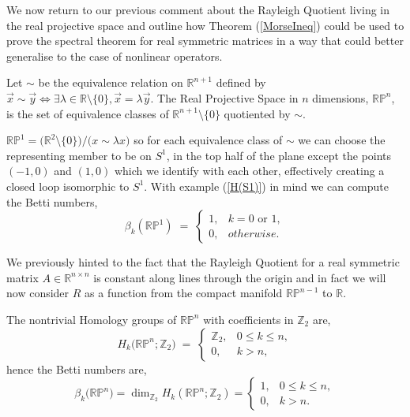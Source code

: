 \noindent We now return to our previous comment about the Rayleigh Quotient living in the real projective space and outline how Theorem (\ref{MorseIneq}) could be used to prove the spectral theorem for real symmetric matrices in a way that could better generalise to the case of nonlinear operators.

\begin{definition}
Let $\sim$ be the equivalence relation on $\mathbb{R}^{n+1}$ defined by $\vec{x} \sim \vec{y} \Leftrightarrow \exists \lambda \in \mathbb{R} \setminus \{0\}, \vec{x} = \lambda \vec{y}$.
The Real Projective Space in $n$ dimensions, $\mathbb{RP}^n$, is the set of equivalence classes of $\mathbb{R}^{n+1} \setminus \{0\}$ quotiented by $\sim$.
\end{definition}

\begin{example}
$\mathbb{RP}^1 = \bigl(\mathbb{R}^2\setminus\{0\}\bigr)\big/\!\bigl(x\sim \lambda x\bigr)$ so for each equivalence class of $\sim$ we can choose the representing member to be on $S^1$, in the top half of the plane except the points $(-1,0)$ and $(1,0)$ which we identify with each other, effectively creating a closed loop isomorphic to $S^1$. With example (\ref{H(S1)}) in mind we can compute the Betti numbers, 
\[
   \beta_k(\mathbb{RP}^1)
   \;=\;
   \begin{cases}
     1, &  k=0\text{ or }1,\\[2pt]
     0, & otherwise.
   \end{cases}
\]
\end{example}
\begin{remark}
We previously hinted to the fact that the Rayleigh Quotient for a real symmetric matrix $A\in \mathbb{R}^{n\times n}$ is constant along lines through the origin and in fact we will now consider $R$ as a function from the compact manifold $\mathbb{RP}^{n-1}$ to $\mathbb{R}.$
\end{remark}

\begin{theorem}
The nontrivial Homology groups of $\mathbb{RP}^n$ with coefficients in $\mathbb{Z}_2$ are, 
\[
   H_{k}\!\bigl(\mathbb{RP}^{n};\mathbb Z_{2}\bigr)
   \;=\;
   \begin{cases}
     \mathbb Z_{2}, & 0\le k\le n,\\[2pt]
     0,             & k>n,
   \end{cases}
\] 
hence the Betti numbers are, 
\[
   \beta_{k}\bigl(\mathbb{RP}^{n}\bigr)=
   \dim_{\mathbb Z_{2}} H_{k}(\mathbb{RP}^{n};\mathbb Z_{2})
   =
   \begin{cases}
     1, & 0\le k\le n,\\[2pt]
     0, & k>n.
   \end{cases}
\]
\end{theorem}

